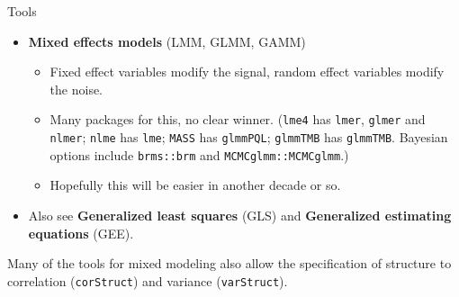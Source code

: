 \documentclass[
  ignorenonframetext,
]{beamer}
\providecommand{\tightlist}{%
  \setlength{\itemsep}{0pt}\setlength{\parskip}{0pt}}
\begin{document}
\begin{frame}[fragile]{Tools}
\protect\hypertarget{tools}{}

\begin{itemize}
\tightlist
\item
  \textbf{Mixed effects models} (LMM, GLMM, GAMM)

  \begin{itemize}
  \tightlist
  \item
    Fixed effect variables modify the signal, random effect variables
    modify the noise.
  \item
    Many packages for this, no clear winner. (\texttt{lme4} has
    \texttt{lmer}, \texttt{glmer} and \texttt{nlmer}; \texttt{nlme} has
    \texttt{lme}; \texttt{MASS} has \texttt{glmmPQL}; \texttt{glmmTMB}
    has \texttt{glmmTMB}. Bayesian options include \texttt{brms::brm}
    and \texttt{MCMCglmm::MCMCglmm}.)
  \item
    Hopefully this will be easier in another decade or so.
  \end{itemize}
\item
  Also see \textbf{Generalized least squares} (GLS) and
  \textbf{Generalized estimating equations} (GEE).
\end{itemize}

Many of the tools for mixed modeling also allow the specification of
structure to correlation (\texttt{corStruct}) and variance
(\texttt{varStruct}).

\end{frame}
\end{document}
